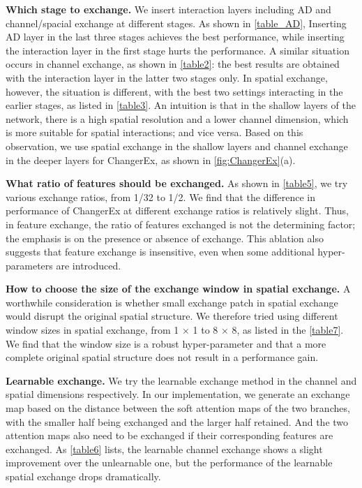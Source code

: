 \documentclass[10pt,twocolumn,letterpaper]{article}
\begin{document}
\textbf{Which stage to exchange.} We insert interaction layers including AD and channel/spacial exchange at different stages. As shown in \cref{table_AD}, Inserting AD layer in the last three stages achieves the best performance, while inserting the interaction layer in the first stage hurts the performance. A similar situation occurs in channel exchange, as shown in \cref{table2}: the best results are obtained with the interaction layer in the latter two stages only. In spatial exchange, however, the situation is different, with the best two settings interacting in the earlier stages, as listed in \cref{table3}. An intuition is that in the shallow layers of the network, there is a high spatial resolution and a lower channel dimension, which is more suitable for spatial interactions; and vice versa. Based on this observation, we use spatial exchange in the shallow layers and channel exchange in the deeper layers for ChangerEx, as shown in \cref{fig:ChangerEx}(a).

\textbf{What ratio of features should be exchanged.}
As shown in \cref{table5}, we try various exchange ratios, from 1/32 to 1/2. We find that the difference in performance of ChangerEx at different exchange ratios is relatively slight. Thus, in feature exchange, the ratio of features exchanged is not the determining factor; the emphasis is on the presence or absence of exchange. This ablation also suggests that feature exchange is insensitive, even when some additional hyper-parameters are introduced.

\textbf{How to choose the size of the exchange window in spatial exchange.} A worthwhile consideration is whether small exchange patch in spatial exchange would disrupt the original spatial structure. We therefore tried using different window sizes in spatial exchange, from 1 × 1 to 8 × 8, as listed in the \cref{table7}. We find that the window size is a robust hyper-parameter and that a more complete original spatial structure does not result in a performance gain.

\textbf{Learnable exchange.} We try the learnable exchange method in the channel and spatial dimensions respectively. In our implementation, we generate an exchange map based on the distance between the soft attention maps of the two branches, with the smaller half being exchanged and the larger half retained. And the two attention maps also need to be exchanged if their corresponding features are exchanged. As \cref{table6} lists, the learnable channel exchange shows a slight improvement over the unlearnable one, but the performance of the learnable spatial exchange drops dramatically.
\end{document}
